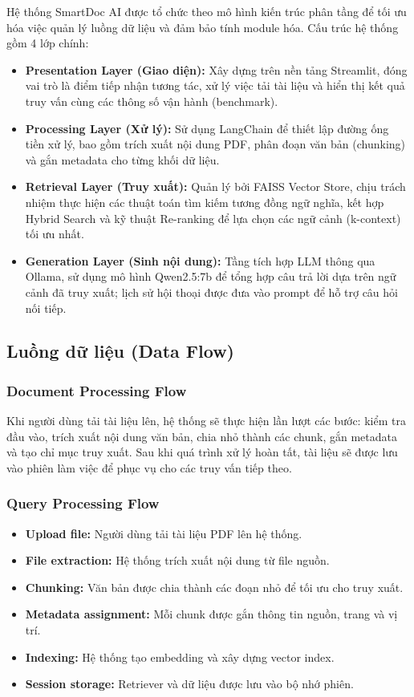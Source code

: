 \documentclass[conference]{IEEEtran}
\begin{document}
Hệ thống SmartDoc AI được tổ chức theo mô hình kiến trúc phân tầng để tối ưu hóa việc quản lý luồng dữ liệu và đảm bảo tính module hóa. Cấu trúc hệ thống gồm 4 lớp chính:
\begin{itemize}
  \item \textbf{Presentation Layer (Giao diện):} Xây dựng trên nền tảng Streamlit, đóng vai trò là điểm tiếp nhận tương tác, xử lý việc tải tài liệu và hiển thị kết quả truy vấn cùng các thông số vận hành (benchmark).
  \item \textbf{Processing Layer (Xử lý):} Sử dụng LangChain để thiết lập đường ống tiền xử lý, bao gồm trích xuất nội dung PDF, phân đoạn văn bản (chunking) và gắn metadata cho từng khối dữ liệu.
  \item \textbf{Retrieval Layer (Truy xuất):} Quản lý bởi FAISS Vector Store, chịu trách nhiệm thực hiện các thuật toán tìm kiếm tương đồng ngữ nghĩa, kết hợp Hybrid Search và kỹ thuật Re-ranking để lựa chọn các ngữ cảnh (k-context) tối ưu nhất.
  \item \textbf{Generation Layer (Sinh nội dung):} Tầng tích hợp LLM thông qua Ollama, sử dụng mô hình Qwen2.5:7b để tổng hợp câu trả lời dựa trên ngữ cảnh đã truy xuất; lịch sử hội thoại được đưa vào prompt để hỗ trợ câu hỏi nối tiếp.
\end{itemize}

\subsection{Luồng dữ liệu (Data Flow)}

\subsubsection{Document Processing Flow}
Khi người dùng tải tài liệu lên, hệ thống sẽ thực hiện lần lượt các bước: kiểm tra đầu vào, trích xuất nội dung văn bản, chia nhỏ thành các chunk, gắn metadata và tạo chỉ mục truy xuất. Sau khi quá trình xử lý hoàn tất, tài liệu sẽ được lưu vào phiên làm việc để phục vụ cho các truy vấn tiếp theo.

\subsubsection{Query Processing Flow}
\begin{itemize}
  \item \textbf{Upload file:} Người dùng tải tài liệu PDF lên hệ thống.
  \item \textbf{File extraction:} Hệ thống trích xuất nội dung từ file nguồn.
  \item \textbf{Chunking:} Văn bản được chia thành các đoạn nhỏ để tối ưu cho truy xuất.
  \item \textbf{Metadata assignment:} Mỗi chunk được gắn thông tin nguồn, trang và vị trí.
  \item \textbf{Indexing:} Hệ thống tạo embedding và xây dựng vector index.
  \item \textbf{Session storage:} Retriever và dữ liệu được lưu vào bộ nhớ phiên.
\end{itemize}
\end{document}
